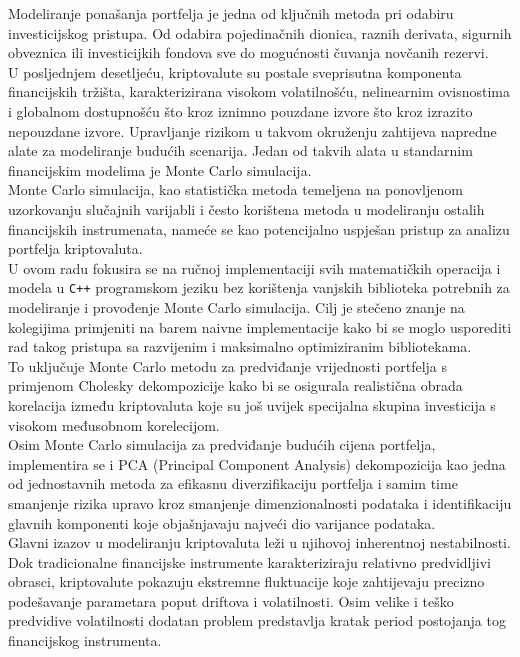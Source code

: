 \documentclass[zavrsnirad, upload]{fer}
\begin{document}
Modeliranje ponašanja portfelja je jedna od ključnih metoda pri odabiru
investicijskog pristupa. Od odabira pojedinačnih dionica, raznih
derivata, sigurnih obveznica ili investicijkih fondova sve do mogućnosti
čuvanja novčanih rezervi.\\
U posljednjem desetljeću, kriptovalute su postale sveprisutna
komponenta financijskih tržišta, karakterizirana visokom volatilnošću,
nelinearnim ovisnostima i globalnom dostupnošću što kroz iznimno pouzdane izvore
što kroz izrazito nepouzdane izvore.
Upravljanje rizikom u takvom okruženju zahtijeva napredne alate za
modeliranje budućih scenarija.
Jedan od takvih alata u standarnim financijskim modelima je Monte Carlo
simulacija.\\
Monte Carlo simulacija, kao statistička metoda temeljena na ponovljenom
uzorkovanju slučajnih varijabli i često korištena metoda u modeliranju
ostalih financijskih instrumenata, nameće se kao potencijalno uspješan
pristup za analizu portfelja kriptovaluta.\\
U ovom radu fokusira se na ručnoj implementaciji svih matematičkih
operacija i modela u \texttt{C++} programskom jeziku bez korištenja
vanjskih biblioteka potrebnih za modeliranje i provođenje Monte
Carlo simulacija. Cilj je stečeno znanje na kolegijima primjeniti
na barem naivne implementacije kako bi se moglo usporediti rad takog
pristupa sa razvijenim i maksimalno optimiziranim bibliotekama.\\
To uključuje Monte Carlo metodu za predviđanje vrijednosti portfelja s primjenom
Cholesky dekompozicije kako bi se osigurala realistična obrada
korelacija između kriptovaluta koje su još uvijek specijalna skupina investicija
s visokom međusobnom korelecijom.\\
Osim Monte Carlo simulacija za predviđanje budućih cijena portfelja,
implementira se i PCA (Principal Component Analysis) dekompozicija
kao jedna od jednostavnih metoda za efikasnu diverzifikaciju portfelja
i samim time smanjenje rizika upravo kroz smanjenje dimenzionalnosti podataka
i identifikaciju glavnih komponenti koje objašnjavaju najveći dio
varijance podataka.\\
Glavni izazov u modeliranju kriptovaluta leži u njihovoj inherentnoj
nestabilnosti. Dok tradicionalne financijske instrumente karakteriziraju
relativno predvidljivi obrasci, kriptovalute pokazuju ekstremne fluktuacije
koje zahtijevaju precizno podešavanje parametara poput driftova i
volatilnosti. Osim velike i teško predvidive volatilnosti dodatan problem
predstavlja kratak period postojanja tog financijskog instrumenta.
\end{document}
